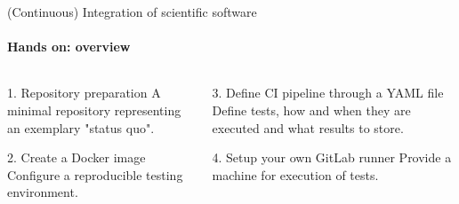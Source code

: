 \begin{frame}{(Continuous) Integration of scientific software}
    \framesubtitle{Hands on: overview}
    \begin{columns}
    \begin{column}{0.48\textwidth}
        \begin{block}{1. Repository preparation}
            A minimal repository representing an exemplary
            "status quo".
        \end{block}
        \begin{block}{2. Create a Docker image}
            Configure a reproducible testing environment.
        \end{block}
    \end{column}

    \begin{column}{0.48\textwidth}
        \begin{block}{3. Define CI pipeline through a YAML file}
            Define tests, how and when they are executed and what
            results to store.
        \end{block}
        \begin{exampleblock}{4. Setup your own GitLab runner}
            Provide a machine for execution of tests.
        \end{exampleblock}
    \end{column}
    \end{columns}
\end{frame}


